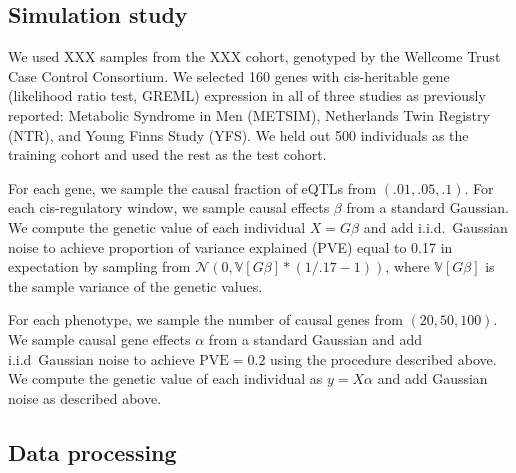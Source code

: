 \documentclass{article}
\begin{document}
\subsection{Simulation study}

We used XXX samples from the XXX cohort, genotyped by the Wellcome Trust Case
Control Consortium. We selected 160 genes with cis-heritable gene (likelihood
ratio test, GREML) expression in all of three studies as previously
reported\cite{10.1038/ng.3506}: Metabolic Syndrome in Men (METSIM), Netherlands
Twin Registry (NTR), and Young Finns Study (YFS). We held out 500 individuals
as the training cohort and used the rest as the test cohort.

For each gene, we sample the causal fraction of eQTLs from $(.01, .05, .1)$.
For each cis-regulatory window, we sample causal effects $\beta$ from a
standard Gaussian. We compute the genetic value of each individual $X = G
\beta$ and add i.i.d.\ Gaussian noise to achieve proportion of variance
explained (PVE) equal to 0.17 in expectation by sampling from $\mathcal{N}(0,
\mathbb{V}[G \beta] * (1 / .17 - 1))$, where $\mathbb{V}[G \beta]$ is the
sample variance of the genetic values.

For each phenotype, we sample the number of causal genes from $(20, 50, 100)$.
We sample causal gene effects $\alpha$ from a standard Gaussian and add
i.i.d\ Gaussian noise to achieve $\text{PVE} = 0.2$ using the procedure
described above. We compute the genetic value of each individual as $y = X
\alpha$ and add Gaussian noise as described above.

\subsection{Data processing}

\end{document}
